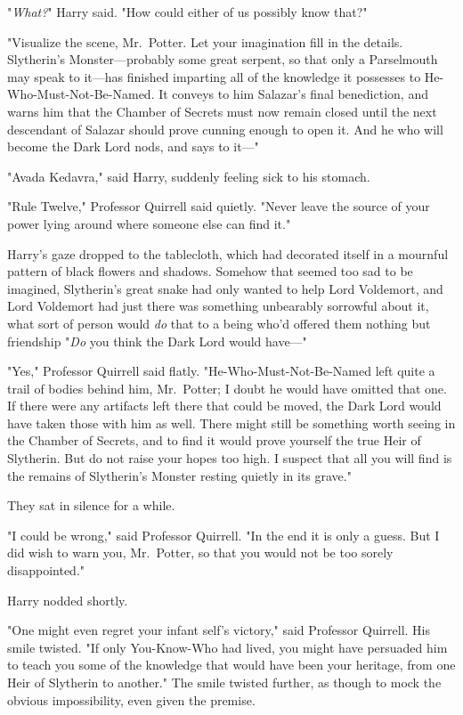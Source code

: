 "\emph{What?}" Harry said. "How could either of us possibly know that?"

"Visualize the scene, Mr.~Potter. Let your imagination fill in the details.
Slytherin's Monster---probably some great serpent, so that only a Parselmouth
may speak to it---has finished imparting all of the knowledge it possesses to
He-Who-Must-Not-Be-Named. It conveys to him Salazar's final benediction, and
warns him that the Chamber of Secrets must now remain closed until the next
descendant of Salazar should prove cunning enough to open it. And he who will
become the Dark Lord nods, and says to it\mbox{---}"

"Avada Kedavra," said Harry, suddenly feeling sick to his stomach.

"Rule Twelve," Professor Quirrell said quietly. "Never leave the source of your
power lying around where someone else can find it."

Harry's gaze dropped to the tablecloth, which had decorated itself in a
mournful pattern of black flowers and shadows. Somehow that seemed{\el} too
sad to be imagined, Slytherin's great snake had only wanted to help Lord
Voldemort, and Lord Voldemort had just{\el} there was something unbearably
sorrowful about it, what sort of person would \emph{do} that to a being who'd
offered them nothing but friendship{\el} "\emph{Do} you think the Dark Lord
would have\mbox{---}"

"Yes," Professor Quirrell said flatly. "He-Who-Must-Not-Be-Named left quite a
trail of bodies behind him, Mr.~Potter; I doubt he would have omitted that one.
If there were any artifacts left there that could be moved, the Dark Lord would
have taken those with him as well. There might still be something worth seeing
in the Chamber of Secrets, and to find it would prove yourself the true Heir of
Slytherin. But do not raise your hopes too high. I suspect that all you will
find is the remains of Slytherin's Monster resting quietly in its grave."

They sat in silence for a while.

"I could be wrong," said Professor Quirrell. "In the end it is only a guess.
But I did wish to warn you, Mr.~Potter, so that you would not be too sorely
disappointed."

Harry nodded shortly.

"One might even regret your infant self's victory," said Professor Quirrell.
His smile twisted. "If only You-Know-Who had lived, you might have persuaded
him to teach you some of the knowledge that would have been your heritage, from
one Heir of Slytherin to another." The smile twisted further, as though to mock
the obvious impossibility, even given the premise.

